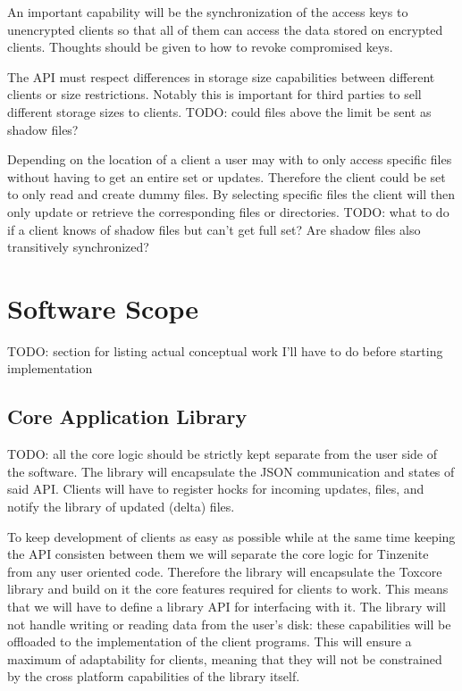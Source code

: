 \begin{description}[leftmargin=2em,style=nextline,noitemsep,nolistsep]
\item[Encryption Key Management]
    An important capability will be the synchronization of the access keys to unencrypted clients so that all of them can access the data stored on encrypted clients.
    Thoughts should be given to how to revoke compromised keys.
\item[Space Management]
    The API must respect differences in storage size capabilities between different clients or size restrictions.
    Notably this is important for third parties to sell different storage sizes to clients.
    TODO: could files above the limit be sent as shadow files?
\item[Shadow Files]
    Depending on the location of a client a user may with to only access specific files without having to get an entire set or updates.
    Therefore the client could be set to only read and create dummy files.
    By selecting specific files the client will then only update or retrieve the corresponding files or directories.
    TODO: what to do if a client knows of shadow files but can't get full set?
    Are shadow files also transitively synchronized?
\end{description}

\section{Software Scope}

TODO: section for listing actual conceptual work I'll have to do before starting implementation

\subsection{Core Application Library}

TODO: all the core logic should be strictly kept separate from the user side of the software.
The library will encapsulate the JSON communication and states of said API.
Clients will have to register hocks for incoming updates, files, and notify the library of updated (delta) files.

To keep development of clients as easy as possible while at the same time keeping the API consisten between them we will separate the core logic for Tinzenite from any user oriented code.
Therefore the library will encapsulate the Toxcore library and build on it the core features required for clients to work.
This means that we will have to define a library API for interfacing with it.
The library will not handle writing or reading data from the user's disk: these capabilities will be offloaded to the implementation of the client programs.
This will ensure a maximum of adaptability for clients, meaning that they will not be constrained by the cross platform capabilities of the library itself.

